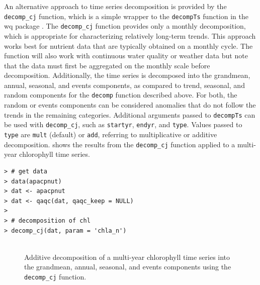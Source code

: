 \documentclass[10pt,letterpaper]{article}\usepackage[]{graphicx}\usepackage[]{color}
\makeatletter
\newenvironment{kframe}{%
 \def\at@end@of@kframe{}%
 \ifinner\ifhmode%
  \def\at@end@of@kframe{\end{minipage}}%
  \begin{minipage}{\columnwidth}%
 \fi\fi%
 \def\FrameCommand##1{\hskip\@totalleftmargin \hskip-\fboxsep
 \colorbox{shadecolor}{##1}\hskip-\fboxsep
     \hskip-\linewidth \hskip-\@totalleftmargin \hskip\columnwidth}%
 \MakeFramed {\advance\hsize-\width
   \@totalleftmargin\z@ \linewidth\hsize
   \@setminipage}}%
 {\par\unskip\endMakeFramed%
 \at@end@of@kframe}
\newenvironment{knitrout}{}{} %
\makeatother
\begin{document}
An alternative approach to time series decomposition is provided by the \texttt{decomp\_cj} function, which is a simple wrapper to the \texttt{decompTs} function in the wq package \cite{Cloern10,Jassby14}.  The \texttt{decomp\_cj} function provides only a monthly decomposition, which is appropriate for characterizing relatively long-term trends.  This approach works best for nutrient data that are typically obtained on a monthly cycle.  The function will also work with continuous water quality or weather data but note that the data must first be aggregated on the monthly scale before decomposition.  Additionally, the time series is decomposed into the grandmean, annual, seasonal, and events components, as compared to trend, seasonal, and random components for the \texttt{decomp} function described above.  For both, the random or events components can be considered anomalies that do not follow the trends in the remaining categories.  Additional arguments passed to \texttt{decompTs} can be used with \texttt{decomp\_cj}, such as \texttt{startyr}, \texttt{endyr}, and \texttt{type}.  Values passed to \texttt{type} are \texttt{mult} (default) or \texttt{add}, referring to multiplicative or additive decomposition.   shows the results from the \texttt{decomp\_cj} function applied to a multi-year chlorophyll time series.

\begin{knitrout}\small
{}\color{fgcolor}\begin{kframe}
\begin{verbatim}
> # get data
> data(apacpnut)
> dat <- apacpnut
> dat <- qaqc(dat, qaqc_keep = NULL)
> 
> # decomposition of chl
> decomp_cj(dat, param = 'chla_n')
\end{verbatim}
\end{kframe}\begin{figure}[!h]

{\centering \includegraphics[width=0.00\textwidth]{figure/decomp_ex2-1} 

}

\caption[Additive decomposition of a multi-year chlorophyll time series into the grandmean, annual, seasonal, and events components using the \texttt{decomp\_cj} function]{Additive decomposition of a multi-year chlorophyll time series into the grandmean, annual, seasonal, and events components using the \texttt{decomp\_cj} function.}\label{fig:decomp_ex2}
\end{figure}


\end{knitrout}
\end{document}
